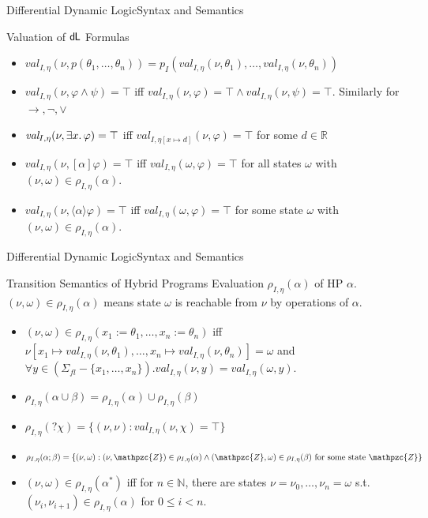 \documentclass{beamer}
\newcommand{\dL}{\text{\upshape\textsf{d{\kern-0.05em}L}}}
\newcommand{\R}{\mathbb{R}}
\newcommand{\val}[4]{\textit{val}_{#1, #2}(#3, #4)}
\newcommand{\valDefault}[1]{\val{I}{\eta}{\nu}{#1}}
\newcommand{\transRel}[3]{\rho_{#1, #2}(#3)}
\newcommand{\transRelDef}[1]{\transRel{I}{\eta}{#1}}
\begin{document}
\begin{frame}{Differential Dynamic Logic}{Syntax and Semantics}
    \begin{block}{Valuation of $\dL$ Formulas}
      \begin{itemize}
      \item $\valDefault{p(\theta_1, \ldots, \theta_n)} = p_I(\valDefault{\theta_1}, \ldots, \valDefault{\theta_n})$
      \item $\valDefault{\varphi \wedge \psi} = \top$ iff
        $\valDefault{\varphi} = \top \wedge \valDefault{\psi} = \top$.
        Similarly for $\to, \neg, \vee$
      \item $\valDefault{\exists x \ldotp \varphi} = \top$ iff
        $\val{I}{\eta[x \mapsto d]}{\nu}{\varphi} = \top$ for some $d \in \R$
      \pause
      \item $\valDefault{[\alpha]\varphi} = \top$ iff
        $\val{I}{\eta}{\omega}{\varphi} = \top$ for all states $\omega$ with $(\nu, \omega)
        \in \transRelDef{\alpha}$.
      \item $\valDefault{\langle\alpha\rangle\varphi} = \top$ iff
        $\val{I}{\eta}{\omega}{\varphi} = \top$ for some state $\omega$ with $(\nu, \omega)
        \in \transRelDef{\alpha}$.
      \end{itemize}
    \end{block}
\end{frame}

\begin{frame}{Differential Dynamic Logic}{Syntax and Semantics}
  \begin{block}{Transition Semantics of Hybrid Programs}
    Evaluation $\transRelDef{\alpha}$ of HP $\alpha$. $(\nu, \omega) \in
    \transRelDef{\alpha}$ means state $\omega$ is reachable from $\nu$ by
    operations of $\alpha$.
    \begin{itemize}
      \item $(\nu, \omega) \in \transRelDef{x_1 := \theta_1, \dots, x_n := \theta_n}$
        iff $\nu[x_1 \mapsto \valDefault{\theta_1}, \ldots, x_n \mapsto
        \valDefault{\theta_n}]
       = \omega$ and $\forall y \in (\Sigma_{\textit{fl}} - \{x_1, \ldots,
       x_n\}). \val{I}{\eta}{\nu}{y} = \val{I}{\eta}{\omega}{y}$.
       \pause
     \item $\transRelDef{\alpha \cup \beta} = \transRelDef{\alpha} \cup
       \transRelDef{\beta}$
       \pause
     \item $\transRelDef{?\chi} = \{(\nu,\nu) : \valDefault{\chi} = \top \}$
       \pause
     \item $\transRelDef{\alpha ; \beta} = \{(\nu,\omega) : (\nu, \mathpzc{Z}) \in
         \transRelDef{\alpha} \wedge (\mathpzc{Z},\omega) \in \transRelDef{\beta}
       \text{ for some state } \mathpzc{Z}\}$
       \pause
     \item $ (\nu, \omega) \in \transRelDef{\alpha^*}$ iff for $n \in
       \mathbb{N}$, there are states $\nu = \nu_0,\ldots,\nu_n = \omega$ s.t.
       $(\nu_i, \nu_{i+1}) \in \transRelDef{\alpha}$ for $0 \leq i < n$.
    \end{itemize}
  \end{block}
\end{frame}
\end{document}
